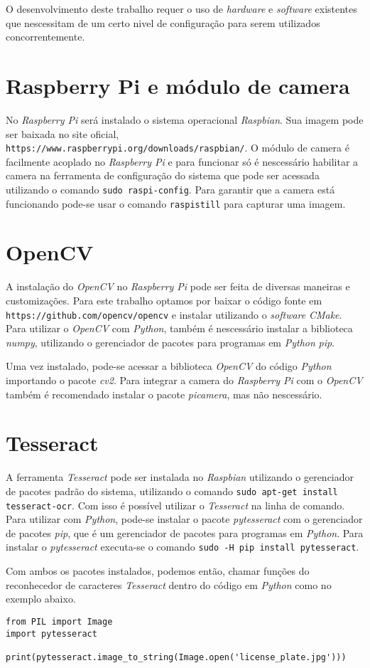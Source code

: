 O desenvolvimento deste trabalho requer o uso de \emph{hardware} e \emph{software} existentes
que nescessitam de um certo nivel de configuração para serem utilizados concorrentemente.

\section{Raspberry Pi e módulo de camera}
\label{sec:confrpi}

No \emph{Raspberry Pi} será instalado o sistema operacional \emph{Raspbian}. Sua imagem pode ser baixada no
site oficial, \texttt{https://www.raspberrypi.org/downloads/raspbian/}. O módulo de camera é facilmente acoplado no
\emph{Raspberry Pi} e para funcionar só é nescessário habilitar a camera na ferramenta de configuração do sistema que pode
ser acessada utilizando o comando \texttt{sudo raspi-config}. Para garantir que a camera está funcionando pode-se usar o
comando \texttt{raspistill} para capturar uma imagem.

\section{OpenCV}
\label{sec:confopencv}

A instalação do \emph{OpenCV} no \emph{Raspberry Pi} pode ser feita de diversas maneiras e customizações.
Para este trabalho optamos por baixar o código fonte em \texttt{https://github.com/opencv/opencv} e instalar
utilizando o \emph{software} \emph{CMake}. Para utilizar o \emph{OpenCV} com \emph{Python}, também é nescessário
instalar a biblioteca \emph{numpy}, utilizando o gerenciador de pacotes para programas em \emph{Python} \emph{pip}.

Uma vez instalado, pode-se acessar a biblioteca \emph{OpenCV} do código \emph{Python} importando o pacote \emph{cv2}.
Para integrar a camera do \emph{Raspberry Pi} com o \emph{OpenCV} também é recomendado instalar o pacote \emph{picamera},
mas não nescessário.

\section{Tesseract}
\label{sec:conftess}

A ferramenta \emph{Tesseract} pode ser instalada no \emph{Raspbian} utilizando o gerenciador de pacotes padrão do sistema,
utilizando o comando \texttt{sudo apt-get install tesseract-ocr}. Com isso é possível utilizar o \emph{Tesseract} na linha
de comando. Para utilizar com \emph{Python}, pode-se instalar o pacote \emph{pytesseract} com o gerenciador de pacotes \emph{pip},
que é um gerenciador de pacotes para programas em \emph{Python}. Para instalar o \emph{pytesseract} executa-se o comando
\texttt{sudo -H pip install pytesseract}.

Com ambos os pacotes instalados, podemos então, chamar funções do reconhecedor de caracteres \emph{Tesseract} dentro
do código em \emph{Python} como no exemplo abaixo.

\begin{verbatim}
from PIL import Image
import pytesseract

print(pytesseract.image_to_string(Image.open('license_plate.jpg')))
\end{verbatim}

